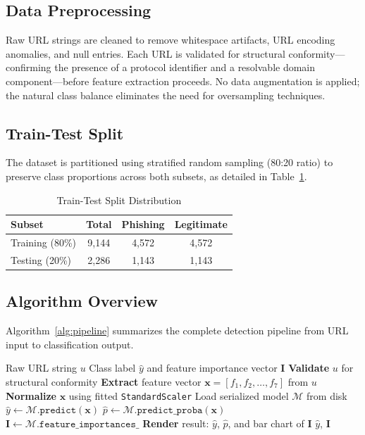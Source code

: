 \documentclass[conference]{IEEEtran}
\begin{document}
\subsection{Data Preprocessing}

Raw URL strings are cleaned to remove whitespace artifacts, URL 
encoding anomalies, and null entries. Each URL is validated for 
structural conformity—confirming the presence of a protocol 
identifier and a resolvable domain component—before feature 
extraction proceeds. No data augmentation is applied; the natural 
class balance eliminates the need for oversampling techniques.

\subsection{Train-Test Split}

The dataset is partitioned using stratified random sampling (80:20 
ratio) to preserve class proportions across both subsets, as 
detailed in Table~\ref{tab:split}.

\begin{table}[htbp]
\caption{Train-Test Split Distribution}
\label{tab:split}
\centering
\renewcommand{\arraystretch}{1.2}
\begin{tabular}{lccc}
\toprule
\textbf{Subset} & \textbf{Total} & 
\textbf{Phishing} & \textbf{Legitimate} \\
\midrule
Training (80\%) & 9,144 & 4,572 & 4,572 \\
Testing  (20\%) & 2,286 & 1,143 & 1,143 \\
\bottomrule
\end{tabular}
\end{table}

\subsection{Algorithm Overview}

Algorithm~\ref{alg:pipeline} summarizes the complete detection 
pipeline from URL input to classification output.

\begin{algorithm}[htbp]
\caption{Phishing URL Detection Pipeline}
\label{alg:pipeline}
\begin{algorithmic}[1]
\renewcommand{\algorithmicrequire}{\textbf{Input:}}
\renewcommand{\algorithmicensure}{\textbf{Output:}}
\REQUIRE Raw URL string $u$
\ENSURE  Class label $\hat{y}$ and feature importance vector $\mathbf{I}$
\STATE \textbf{Validate} $u$ for structural conformity
\STATE \textbf{Extract} feature vector $\mathbf{x} = [f_1, f_2, \ldots, f_7]$ 
       from $u$
\STATE \textbf{Normalize} $\mathbf{x}$ using fitted \texttt{StandardScaler}
\STATE Load serialized model $\mathcal{M}$ from disk
\STATE $\hat{y} \leftarrow \mathcal{M}.\texttt{predict}(\mathbf{x})$
\STATE $\hat{p} \leftarrow \mathcal{M}.\texttt{predict\_proba}(\mathbf{x})$
\STATE $\mathbf{I} \leftarrow \mathcal{M}.\texttt{feature\_importances\_}$
\STATE \textbf{Render} result: $\hat{y}$, $\hat{p}$, and bar chart of 
       $\mathbf{I}$
\RETURN $\hat{y}$, $\mathbf{I}$
\end{algorithmic}
\end{algorithm}
\end{document}
